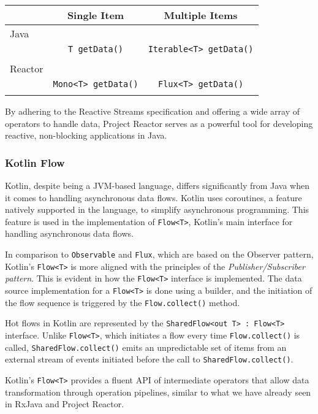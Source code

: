 \begin{center}
\begin{tabular}{ |l|c|c| }
\hline
    & Single Item & Multiple Items \\ \hline
    Java & & \\ 
    & \texttt{T getData()}  & \texttt{Iterable<T> getData()} \\
    & & \\
    \hline
    Reactor & & \\ 
    & \texttt{Mono<T> getData()} & \texttt{Flux<T> getData()} \\
    & & \\
    \hline
\end{tabular}
\end{center}

By adhering to the Reactive Streams specification and offering a wide array of operators to handle data, Project Reactor serves as a powerful tool for developing reactive, non-blocking applications in Java.

\subsubsection{Kotlin Flow}
\label{sec:kotlinflow}

Kotlin, despite being a JVM-based language, differs significantly from Java when it comes to handling asynchronous data flows. Kotlin uses coroutines, a feature natively supported in the language, to simplify asynchronous programming. This feature is used in the implementation of \texttt{Flow<T>}, Kotlin's main interface for handling asynchronous data flows.

In comparison to \texttt{Observable} and \texttt{Flux}, which are based on the Observer pattern, Kotlin's \texttt{Flow<T>} is more aligned with the principles of the \textit{Publisher/Subscriber pattern}. This is evident in how the \texttt{Flow<T>} interface is implemented. The data source implementation for a \texttt{Flow<T>} is done using a builder, and the initiation of the flow sequence is triggered by the \texttt{Flow.collect()} method.

Hot flows in Kotlin are represented by the \texttt{SharedFlow<out T> : Flow<T>} interface. Unlike \texttt{Flow<T>}, which initiates a flow every time \texttt{Flow.collect()} is called, \texttt{SharedFlow.collect()} emits an unpredictable set of items from an external stream of events initiated before the call to \texttt{SharedFlow.collect()}. 

Kotlin's \texttt{Flow<T>} provides a fluent API of intermediate operators that allow data transformation through operation pipelines, similar to what we have already seen in RxJava and Project Reactor. 

